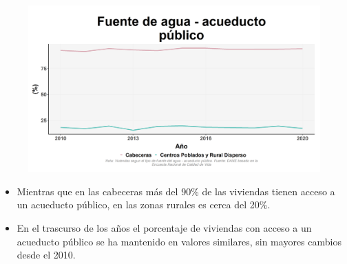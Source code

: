     \begin{figure}[H]
        \caption[Acueducto público como fuentes de agua por zonas ]{\label{cueducto_publico_zonas} }
        \begin{center}
        \includegraphics[width=\textwidth,keepaspectratio]{img/var_130_trend.png}
        \end{center}
    \end{figure}
            \begin{itemize}
                    \item Mientras que en las cabeceras más del 90\% de las viviendas tienen acceso a un acueducto público, en las zonas rurales es cerca del 20\%.
                    \item En el trascurso de los años el porcentaje de viviendas con acceso a un acueducto público se ha mantenido en valores similares, sin mayores cambios desde el 2010.
                    \end{itemize}

